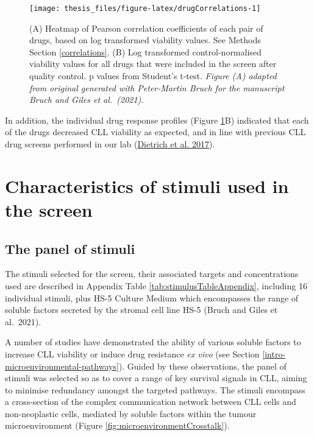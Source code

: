 \documentclass[11pt, a4paper, twosided]{book}
\begin{document}
\begin{figure}

{\centering \texttt{[image: thesis\_files/figure-latex/drugCorrelations-1]} 

}

\caption{(A) Heatmap of Pearson correlation coefficients of each pair of drugs, based on log transformed viability values. See Methods Section \ref{correlations}. (B) Log transformed control-normalised viability values for all drugs that were included in the screen after quality control. p values from Student's t-test. \emph{Figure (A) adapted from original generated with Peter-Martin Bruch for the manuscript Bruch and Giles et al.~(2021).}}\label{fig:drugCorrelations}
\end{figure}
In addition, the individual drug response profiles (Figure \ref{fig:drugCorrelations}B) indicated that each of the drugs decreased CLL viability as expected, and in line with previous CLL drug screens performed in our lab (\protect\hyperlink{ref-JCIpaper}{Dietrich et al. 2017}).

\hypertarget{stimuli}{%
\section{Characteristics of stimuli used in the screen}\label{stimuli}}

\hypertarget{stimuli-info}{%
\subsection{The panel of stimuli}\label{stimuli-info}}

The stimuli selected for the screen, their associated targets and concentrations used are described in Appendix Table \ref{tab:stimulusTableAppendix}, including 16 individual stimuli, plus HS-5 Culture Medium which encompasses the range of soluble factors secreted by the stromal cell line HS-5 (Bruch and Giles et al.~2021).

A number of studies have demonstrated the ability of various soluble factors to increase CLL viability or induce drug resistance \emph{ex vivo} (see Section \ref{intro-microenvironmental-pathways}). Guided by these observations, the panel of stimuli was selected so as to cover a range of key survival signals in CLL, aiming to minimise redundancy amongst the targeted pathways. The stimuli encompass a cross-section of the complex communication network between CLL cells and non-neoplastic cells, mediated by soluble factors within the tumour microenvironment (Figure \ref{fig:microenvironmentCrosstalk}).
\end{document}

